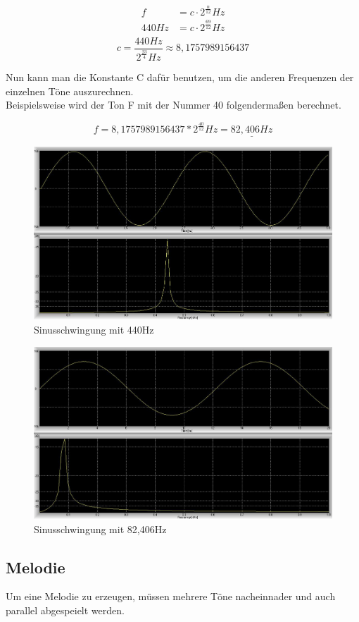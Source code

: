 \documentclass[12pt,a4paper]{report}
\begin{document}
\begin{equation*}
\begin{split}
  f &=c \cdot 2^{\frac{n}{12}} Hz \\
  440 Hz &= c \cdot 2^{\frac{69}{12}} Hz \\  
\end{split}
\end{equation*}
\begin{equation*}
    c = \frac{440 Hz}{2^{\frac{23}{4}} Hz} \approx 8,1757989156437
\end{equation*}

Nun kann man die Konstante C dafür benutzen, um die anderen Frequenzen der
einzelnen Töne auszurechnen. \\
Beispielsweise wird der Ton F mit der Nummer 40
folgendermaßen berechnet.

\begin{equation*}
    f= 8,1757989156437 * 2^{\frac{40}{12}} Hz = \underline{82,406 Hz} 
\end{equation*}

\newpage

\begin{figure}[htb]
\centering
\includegraphics[scale=0.4]{Images/Sinus440Hz.JPG}
\caption[Verzeichniseintrag]{Sinusschwingung mit 440Hz }
\end{figure}
\begin{figure}[htb]
\centering
\includegraphics[scale=0.4]{Images/Sinus82Hz.JPG}
\caption[Verzeichniseintrag]{Sinusschwingung mit 82,406Hz }
\end{figure}

\subsection{Melodie}

Um eine Melodie zu erzeugen, müssen mehrere Töne nacheinnader und auch parallel
abgespeielt werden.
\end{document}
